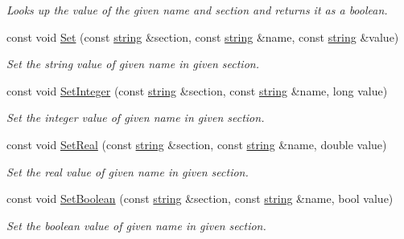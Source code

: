 \begin{DoxyCompactItemize}
\begin{DoxyCompactList}\small\item\em Looks up the value of the given name and section and returns it as a boolean. \end{DoxyCompactList}\item 
const void \hyperlink{class_ensum_1_1_file_handler_1_1ini_a7981581cf337fa3829dc95bc3def5a72}{Set} (const \hyperlink{class_ensum_1_1string}{string} \&section, const \hyperlink{class_ensum_1_1string}{string} \&name, const \hyperlink{class_ensum_1_1string}{string} \&value)
\begin{DoxyCompactList}\small\item\em Set the string value of given name in given section. \end{DoxyCompactList}\item 
const void \hyperlink{class_ensum_1_1_file_handler_1_1ini_a1ed4f9fa3abb4a1ce94fafd64d348af6}{Set\+Integer} (const \hyperlink{class_ensum_1_1string}{string} \&section, const \hyperlink{class_ensum_1_1string}{string} \&name, long value)
\begin{DoxyCompactList}\small\item\em Set the integer value of given name in given section. \end{DoxyCompactList}\item 
const void \hyperlink{class_ensum_1_1_file_handler_1_1ini_ae628d6053f8e94a6acc8499961741317}{Set\+Real} (const \hyperlink{class_ensum_1_1string}{string} \&section, const \hyperlink{class_ensum_1_1string}{string} \&name, double value)
\begin{DoxyCompactList}\small\item\em Set the real value of given name in given section. \end{DoxyCompactList}\item 
const void \hyperlink{class_ensum_1_1_file_handler_1_1ini_ac31a3463aeec3b6c378e2b5a8f73de8f}{Set\+Boolean} (const \hyperlink{class_ensum_1_1string}{string} \&section, const \hyperlink{class_ensum_1_1string}{string} \&name, bool value)
\begin{DoxyCompactList}\small\item\em Set the boolean value of given name in given section. \end{DoxyCompactList}\end{DoxyCompactItemize}
